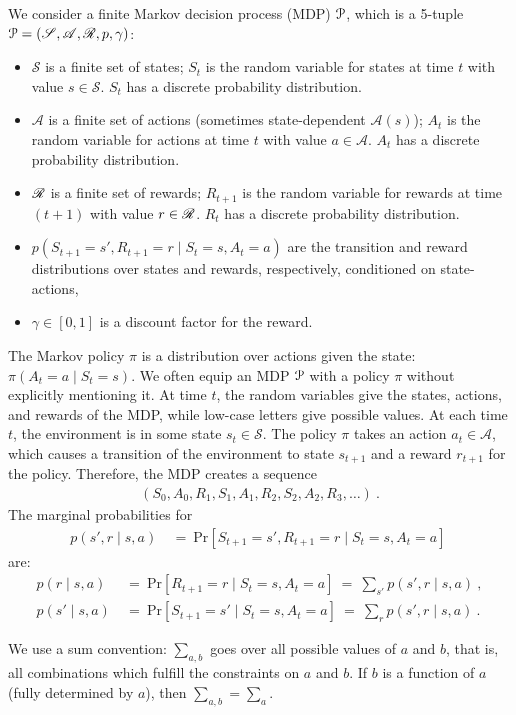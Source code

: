 \documentclass{article}
\newcommand{\sA}{\mathscr{A}} \newcommand{\sB}{\mathscr{B}}
\newcommand{\sS}{\mathscr{S}} \newcommand{\sT}{\mathscr{T}}
\newcommand\PR{\mathbf{\mathrm{Pr}}}
\begin{document}
\begin{appendices}
We consider a finite Markov decision process (MDP) $\mathcal{P}$,
which is a 5-tuple $\cP=(\sS,\sA,\sR,p,\gamma )$:
\begin{itemize}
\item $\sS$ is a finite set of states;
  $S_t$ is the random variable
  for states at time $t$ with value
  $s \in \sS$. $S_t$ has a discrete probability distribution.
\item    $\sA$  is a finite set of actions (sometimes state-dependent
  $\sA(s)$);  $A_t$ is the random variable
  for actions at time $t$ with value
  $a \in \sA$. $A_t$ has a discrete probability distribution.
\item $\mathscr{R}$  is a finite set of rewards; $R_{t+1}$ is the random variable
  for rewards at time $(t+1)$ with value
  $r \in \mathscr{R}$. $R_t$ has a discrete probability distribution.
\item $p(S_{t+1}=s',R_{t+1}=r \mid S_t=s,A_t=a)$ are the
  transition and reward distributions over states and rewards, respectively, conditioned on
  state-actions,
\item  $\gamma \in [0, 1]$ is a discount factor for the reward.
\end{itemize}
The Markov policy $\pi$ is a distribution over
actions given the state: $\pi(A_t=a \mid S_t=s)$.
We often equip an MDP $\mathcal{P}$ with a policy $\pi$ 
without explicitly mentioning it. 
At time $t$, the random variables give the states, actions, and
rewards of the MDP, while low-case letters give possible values.
At each time $t$, the environment is in some state $s_t \in \sS$. The policy
$\pi$ takes an action $a_t \in \sA$, which causes a transition of
the environment to state $s_{t+1}$ and a reward $r_{t+1}$ for the
policy.
Therefore, the MDP creates a sequence
\begin{align}
\left(S_0,A_0,R_1,S_1,A_1,R_2,S_2,A_2,R_3,\ldots \right) \ .
\end{align}
The marginal probabilities for 
\begin{align}
p(s',r\mid s,a) \ &= \ \PR\left[S_{t+1}=s',R_{t+1}=r \mid S_t=s,A_t=a
  \right] \   
\end{align}
are:
\begin{align}
  p(r\mid s,a) \ &= \ \PR\left[R_{t+1}=r \mid S_t=s,A_t=a
  \right] \ = \ \sum_{s'}p(s',r\mid s,a) \ , \\
  p(s'\mid s,a) \ &= \ \PR\left[S_{t+1}=s' \mid S_t=s,A_t=a
  \right] \ = \ \sum_{r}p(s',r\mid s,a) \ .
\end{align}


We use a sum convention: $\sum_{a,b}$ goes over all possible values of
$a$ and $b$, that is, all combinations which fulfill the constraints
on $a$ and $b$. If $b$ is a function of $a$ (fully determined by $a$),
then $\sum_{a,b}=\sum_{a}$.



\end{appendices}
\end{document}

